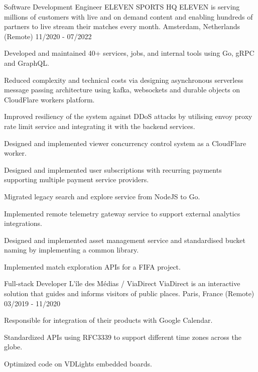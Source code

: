 \begin{cventries}
  \cventry
    {Software Development Engineer} %
    {ELEVEN SPORTS HQ} %
    {ELEVEN is serving millions of customers with live and on demand content and enabling hundreds of partners to live stream their matches every month.}
    {Amsterdam, Netherlands (Remote)} %
    {11/2020 - 07/2022} %
    {
      \begin{cvitems}
        \item{Developed and maintained 40+ services, jobs, and internal tools using Go, gRPC and GraphQL.}
        \item{Reduced complexity and technical costs via designing asynchronous serverless message passing architecture using kafka, websockets and durable objects on CloudFlare workers platform.}
        \item{Improved resiliency of the system against DDoS attacks by utilising envoy proxy rate limit service and integrating it with the backend services.}
        \item{Designed and implemented viewer concurrency control system as a CloudFlare worker.}
        \item{Designed and implemented user subscriptions with recurring payments supporting multiple payment service providers.}
        \item{Migrated legacy search and explore service from NodeJS to Go.}
        \item{Implemented remote telemetry gateway service to support external analytics integrations.}
        \item{Designed and implemented asset management service and standardised bucket naming by implementing a common library.}
        \item{Implemented match exploration APIs for a FIFA project.}
      \end{cvitems}
    }

  \cventry
    {Full-stack Developer} %
    {L'île des Médias / ViaDirect} %
    {ViaDirect is an interactive solution that guides and informs visitors of public places.}
    {Paris, France (Remote)} %
    {03/2019 - 11/2020} %
    {
      \begin{cvitems}
        \item{Responsible for integration of their products with Google Calendar.}
        \item{Standardized APIs using RFC3339 to support different time zones across the globe.}
        \item{Optimized code on VDLights embedded boards.}
      \end{cvitems}
    }


\end{cventries}
